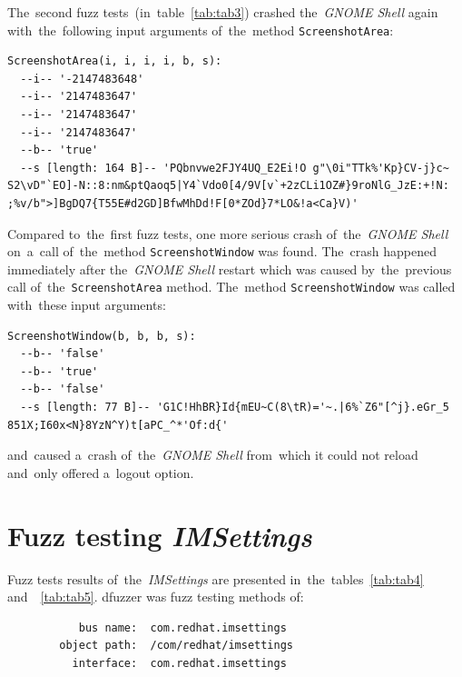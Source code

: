The~second fuzz tests~(in~table~\ref{tab:tab3}) crashed the~\emph{GNOME Shell}
again with~the~following input arguments of~the~method \texttt{ScreenshotArea}:
\begin{verbatim}
ScreenshotArea(i, i, i, i, b, s):
  --i-- '-2147483648'
  --i-- '2147483647'
  --i-- '2147483647'
  --i-- '2147483647'
  --b-- 'true'
  --s [length: 164 B]-- 'PQbnvwe2FJY4UQ_E2Ei!O g"\0i"TTk%'Kp}CV-j}c~
S2\vD"`EO]-N::8:nm&ptQaoq5|Y4`Vdo0[4/9V[v`+2zCLi1OZ#}9roNlG_JzE:+!N:
;%v/b">]BgDQ7{T55E#d2GD]BfwMhDd!F[0*ZOd}7*LO&!a<Ca}V)'
\end{verbatim}
Compared to~the~first fuzz tests, one more serious crash of~the~\emph{GNOME Shell}
on~a~call of~the~method \texttt{ScreenshotWindow} was found. The~crash happened
immediately after the~\emph{GNOME Shell} restart which was caused by~the~previous
call of~the~\texttt{ScreenshotArea} method. The~method \texttt{ScreenshotWindow}
was called with~these input arguments:
\begin{verbatim}
ScreenshotWindow(b, b, b, s):
  --b-- 'false'
  --b-- 'true'
  --b-- 'false'
  --s [length: 77 B]-- 'G1C!HhBR}Id{mEU~C(8\tR)='~.|6%`Z6"[^j}.eGr_5
851X;I60x<N}8YzN^Y)t[aPC_^*'Of:d{'
\end{verbatim}
and~caused a~crash of~the~\emph{GNOME Shell} from~which it could not reload
and~only offered a~logout option.


\section{Fuzz testing \emph{IMSettings}}
Fuzz tests results of~the~\emph{IMSettings} are presented
in~the~tables~\ref{tab:tab4} and~~\ref{tab:tab5}.
dfuzzer was fuzz testing methods of:
\begin{verbatim}
           bus name:  com.redhat.imsettings
        object path:  /com/redhat/imsettings
          interface:  com.redhat.imsettings
\end{verbatim}


